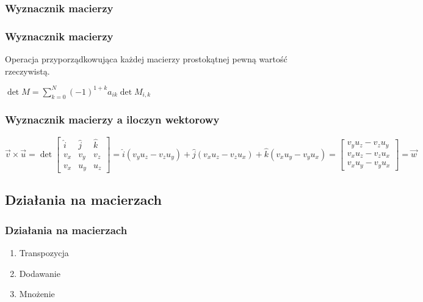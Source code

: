 \documentclass{beamer}
\begin{document}
\subsubsection{Wyznacznik macierzy}

\begin{frame}
  \frametitle{Wyznacznik macierzy}
  \begin{definition}
    Operacja przyporządkowująca każdej macierzy prostokątnej pewną wartość rzeczywistą.
    \begin{center}
      \begin{math}
        \det{M} = \sum_{k = 0}^{N} (-1)^{1 + k} a_{ik} \det{M_{i, k}}
      \end{math}
    \end{center}
  \end{definition}
\end{frame}

\begin{frame}
  \frametitle{Wyznacznik macierzy a iloczyn wektorowy}
  \begin{definition}
    \begin{center}
      \begin{math}
        \overrightarrow{v} \times \overrightarrow{u} = \det{
          \begin{bmatrix}
        \hat{i}  & \hat{j}  & \hat{k} \\
        v_{x}  & v_{y} & v_{z} \\
        v_{x}  & u_{y} & u_{z}
          \end{bmatrix}
        } = \hat{i}(v_{y}u_{z} - v_{z}u_{y}) + \hat{j}(v_{x}u_{z} - v_{z}u_{x}) + \hat{k}(v_{x}u_{y} - v_{y}u_{x})
      = \begin{bmatrix}
        v_{y}u_{z} - v_{z}u_{y} \\
        v_{x}u_{z} - v_{z}u_{x} \\
        v_{x}u_{y} - v_{y}u_{x}
      \end{bmatrix} = \overrightarrow{w}
      \end{math}
    \end{center}
  \end{definition}
\end{frame}

\subsection{Działania na macierzach}
\begin{frame}
  \frametitle{Działania na macierzach}
  \begin{enumerate}
    \item<1-> Transpozycja
    \item<2-> Dodawanie
    \item<3-> Mnożenie
  \end{enumerate}
\end{frame}
\end{document}

